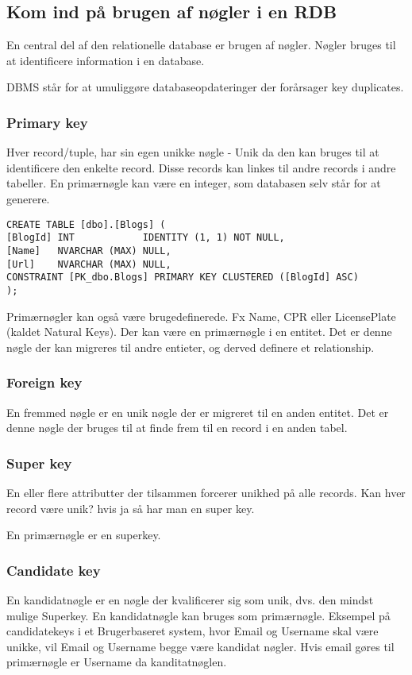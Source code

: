 \subsection{Kom ind på brugen af nøgler i en RDB}\label{sec:keys}
En central del af den relationelle database er brugen af nøgler. Nøgler bruges til at identificere information i en database.

DBMS står for at umuliggøre databaseopdateringer der forårsager key duplicates.

\subsubsection{Primary key}
Hver record/tuple, har sin egen unikke nøgle - Unik da den kan bruges til at identificere den enkelte record. Disse records kan linkes til andre records i andre tabeller. En primærnøgle kan være en integer, som databasen selv står for at generere.


\begin{lstlisting}
CREATE TABLE [dbo].[Blogs] (
[BlogId] INT            IDENTITY (1, 1) NOT NULL,
[Name]   NVARCHAR (MAX) NULL,
[Url]    NVARCHAR (MAX) NULL,
CONSTRAINT [PK_dbo.Blogs] PRIMARY KEY CLUSTERED ([BlogId] ASC)
);
\end{lstlisting}

Primærnøgler kan også være brugedefinerede. Fx Name, CPR eller  LicensePlate (kaldet Natural Keys). Der kan være en primærnøgle i en entitet. Det er denne nøgle der kan migreres til andre entieter, og derved definere et relationship.
\subsubsection{Foreign key}
En fremmed nøgle er en unik nøgle der er migreret til en anden entitet.
Det er denne nøgle der bruges til at finde frem til en record i en anden tabel.

\subsubsection{Super key}
En eller flere attributter der tilsammen forcerer unikhed på alle records.
Kan hver record være unik? hvis ja så har man en super key. 

En primærnøgle er en superkey.

\subsubsection{Candidate key}
En kandidatnøgle er en nøgle der kvalificerer sig som unik, dvs. den mindst mulige Superkey. En kandidatnøgle kan bruges som primærnøgle. Eksempel på candidatekeys i et Brugerbaseret system, hvor Email og Username skal være unikke, vil Email og Username begge være kandidat nøgler. Hvis email gøres til primærnøgle er Username da kanditatnøglen.

